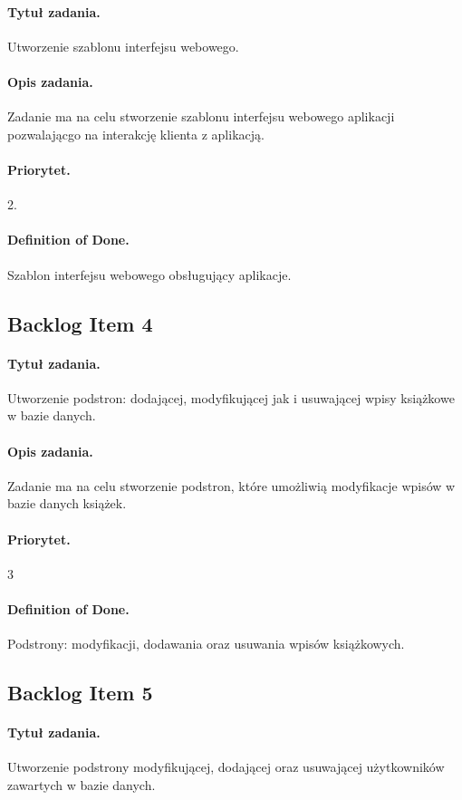 \documentclass[a4paper]{article}
\begin{document}
\paragraph{Tytuł zadania.} Utworzenie szablonu interfejsu webowego.
\paragraph{Opis zadania.} Zadanie ma na celu stworzenie szablonu interfejsu webowego aplikacji pozwalającgo na interakcję klienta z aplikacją.
\paragraph{Priorytet.} 2.
\paragraph{Definition of Done.}Szablon interfejsu webowego obsługujący aplikacje.

\subsection{Backlog Item 4}
\paragraph{Tytuł zadania.} Utworzenie podstron: dodającej, modyfikującej jak i usuwającej wpisy książkowe w bazie danych.
\paragraph{Opis zadania.} Zadanie ma na celu stworzenie podstron, które umożliwią modyfikacje wpisów w bazie danych książek.
\paragraph{Priorytet.} 3
\paragraph{Definition of Done.} Podstrony: modyfikacji, dodawania oraz usuwania wpisów książkowych.

\subsection{Backlog Item 5}
\paragraph{Tytuł zadania.} Utworzenie podstrony modyfikującej, dodającej oraz usuwającej użytkowników zawartych w bazie danych.
\end{document}
